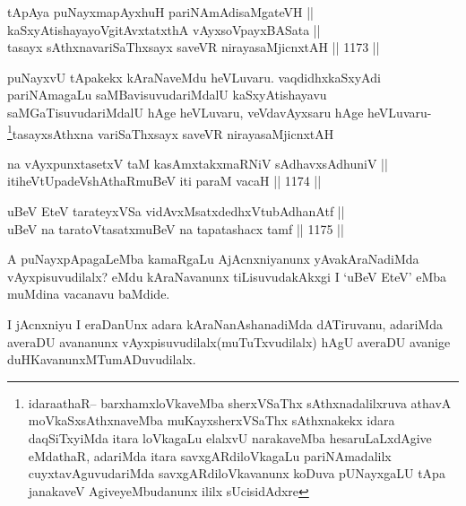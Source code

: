 \begin{shl}
tApAya puNayxmapAyxhuH pariNAmAdisaMgateVH || \\
kaSxyAtishayayoVgitAvxtatxthA vAyxsoV\s payxBASata || \\
tasayx sAthxnavariSaThxsayx saveVR nirayasaMjicnxtAH \hfill || 1173 ||  
\end{shl}	

\begin{artha}
puNayxvU tApakekx kAraNaveMdu heVLuvaru. vaqdidhxkaSxyAdi pariNAmagaLu saMBavisuvudariMdalU kaSxyAtishayavu saMGaTisuvudariMdalU hAge heVLuvaru, veVdavAyxsaru hAge heVLuvaru-\\
\footnote{idaraathaR{\rm --} barxhamxloVkaveMba sherxVSaThx sAthxnadalilxruva athavA moVkaSxsAthxnaveMba muKayxsherxVSaThx sAthxnakekx idara daqSiTxyiMda itara loVkagaLu elalxvU narakaveMba hesaruLaLxdAgive eMdathaR, adariMda itara savxgARdiloVkagaLu pariNAmadalilx cuyxtavAguvudariMda savxgARdiloVkavanunx koDuva pUNayxgaLU tApa janakaveV AgiveyeMbudanunx ililx sUcisidAdxre}tasayxsAthxna variSaThxsayx saveVR nirayasaMjicnxtAH
\end{artha}




\begin{shl}
na vAyxpunxtasetxV taM kasAmxtakxmaRNiV sAdhavxsAdhuniV || \\
itiheVtUpadeVshAthaRmuBeV iti paraM vacaH \hfill || 1174 ||  
\end{shl}
				
\begin{shl}
uBeV EteV tarateyxVSa vidAvxMsatxdedhxVtubAdhanAtf || \\
uBeV na taratoV\s tasatxmuBeV na tapatashacx tamf \hfill || 1175 ||  
\end{shl}

\begin{artha}
A puNayxpApagaLeMba kamaRgaLu AjAcnxniyanunx yAvakAraNadiMda vAyxpisuvudilalx? eMdu 
kAraNavanunx tiLisuvudakAkxgi I `uBeV EteV' eMba muMdina vacanavu baMdide.
\end{artha}

\begin{artha}
I jAcnxniyu I eraDanUnx adara kAraNanAshanadiMda dATiruvanu, adariMda averaDU avananunx vAyxpisuvudilalx(muTuTxvudilalx) hAgU averaDU avanige duHKavanunxMTumADuvudilalx.
\end{artha}

